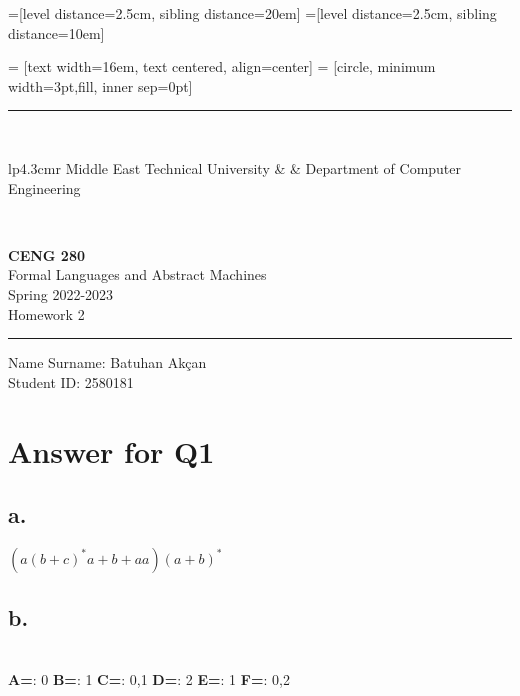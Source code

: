 \documentclass[12pt]{article}
\newcommand{\HRule}{\rule{\linewidth}{1mm}}
\begin{document}
=[level distance=2.5cm, sibling distance=20em]
=[level distance=2.5cm, sibling distance=10em]

 = [text width=16em, text centered, align=center]
 = [circle, minimum width=3pt,fill, inner sep=0pt]

\noindent
\HRule \\[3mm]
\small
\begin{tabular}[b]{lp{4.3cm}r}
Middle East Technical University &  &
Department of Computer Engineering \\
\end{tabular} \\
\begin{center}

                 \LARGE \textbf{CENG 280} \\[4mm]
                 \Large Formal Languages and Abstract Machines \\[4mm]
                \normalsize Spring 2022-2023 \\
                    \Large Homework 2 \\
\end{center}
\HRule



\begin{center}
Name Surname: Batuhan Akçan   \\
Student ID: 2580181
\end{center}



\section*{Answer for Q1}

\subsection*{a.} 
$ (a(b+c)^*a + b + aa)(a+b)^* $
\subsection*{b.}    \hfill\\
\textbf{A=}: 0       \newline
\textbf{B=}: 1       \newline
\textbf{C=}: 0,1       \newline
\textbf{D=}: 2       \newline
\textbf{E=}: 1       \newline
\textbf{F=}: 0,2       
\end{document}
